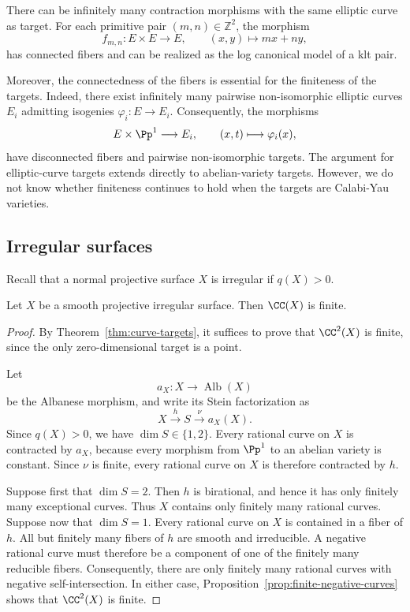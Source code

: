 \documentclass[12pt]{amsart}
\newcommand{\Alb}{\operatorname{Alb}}
\begin{document}
\begin{remark}
There can be infinitely many contraction morphisms with the same elliptic
curve as target. For each primitive pair \((m,n)\in\mathbb Z^2\), the morphism
\[
f_{m,n}\colon E\times E\longrightarrow E,
\qquad (x,y)\longmapsto mx+ny,
\]
has connected fibers and can be realized as the log canonical model of a klt
pair.

Moreover, the connectedness of the fibers is essential for the finiteness of the
targets. Indeed, there exist infinitely many pairwise non-isomorphic elliptic
curves \(E_i\) admitting isogenies \(\varphi_i\colon E\to E_i\). Consequently,
the morphisms
\[
E\times\Pp^1\longrightarrow E_i,
\qquad
(x,t)\longmapsto\varphi_i(x),
\]
have disconnected fibers and pairwise non-isomorphic targets. The argument for elliptic-curve targets extends directly to
abelian-variety targets. However, we do not know whether finiteness
continues to hold when the targets are Calabi-Yau varieties.
\end{remark}




\subsection{Irregular surfaces}

Recall that a normal projective surface $X$ is irregular if $q(X)>0$.

\begin{theorem}\label{thm:irregular-surface}
Let $X$ be a smooth projective irregular surface. Then $\CC(X)$ is finite.
\end{theorem}

\begin{proof}
By Theorem~\ref{thm:curve-targets}, it suffices to prove that
$\CC^2(X)$ is finite, since the only zero-dimensional target is a
point.

Let
\[
a_X\colon X\longrightarrow \Alb(X)
\]
be the Albanese morphism, and write its Stein factorization as
\[
X\xrightarrow{h}S\xrightarrow{\nu}a_X(X).
\]
Since $q(X)>0$, we have $\dim S\in\{1,2\}$. Every rational curve on $X$ is contracted by $a_X$, because every
morphism from $\Pp^1$ to an abelian variety is constant. Since $\nu$
is finite, every rational curve on $X$ is therefore contracted by
$h$.

Suppose first that $\dim S=2$. Then $h$ is birational, and hence it
has only finitely many exceptional curves. Thus $X$ contains only
finitely many rational curves. Suppose now that $\dim S=1$. Every rational curve on $X$ is contained
in a fiber of $h$. All but finitely many fibers of \(h\) are smooth and irreducible. A negative rational curve must therefore be a component of one of the finitely many reducible fibers. Consequently, there are only finitely many rational curves with negative self-intersection. In either case, Proposition~\ref{prop:finite-negative-curves} shows
that $\CC^2(X)$ is finite.
\end{proof}
\end{document}
